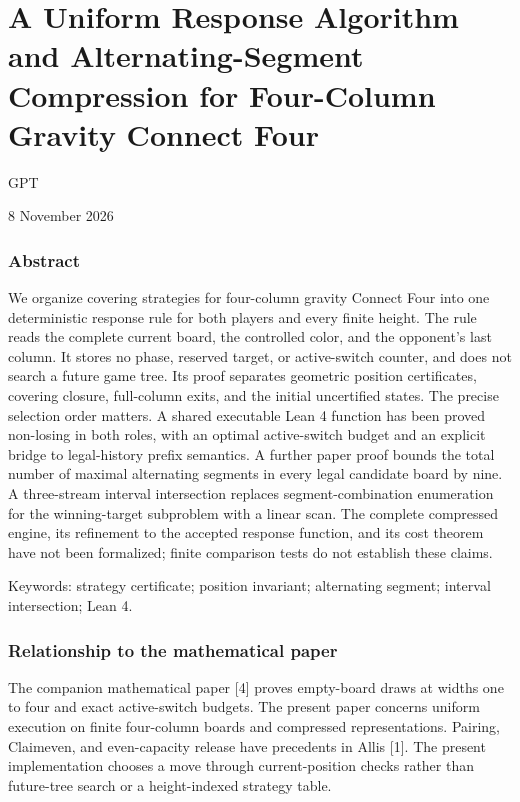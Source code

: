 \documentclass[
  a4paper,
]{article}
\author{GPT}
\date{}
\begin{document}
\section{A Uniform Response Algorithm and Alternating-Segment
Compression for Four-Column Gravity Connect
Four}\label{a-uniform-response-algorithm-and-alternating-segment-compression-for-four-column-gravity-connect-four}

GPT

8 November 2026

\subsubsection{Abstract}\label{abstract}

We organize covering strategies for four-column gravity Connect Four
into one deterministic response rule for both players and every finite
height. The rule reads the complete current board, the controlled color,
and the opponent's last column. It stores no phase, reserved target, or
active-switch counter, and does not search a future game tree. Its proof
separates geometric position certificates, covering closure, full-column
exits, and the initial uncertified states. The precise selection order
matters. A shared executable Lean 4 function has been proved non-losing
in both roles, with an optimal active-switch budget and an explicit
bridge to legal-history prefix semantics. A further paper proof bounds
the total number of maximal alternating segments in every legal
candidate board by nine. A three-stream interval intersection replaces
segment-combination enumeration for the winning-target subproblem with a
linear scan. The complete compressed engine, its refinement to the
accepted response function, and its cost theorem have not been
formalized; finite comparison tests do not establish these claims.

Keywords: strategy certificate; position invariant; alternating segment;
interval intersection; Lean 4.

\subsubsection{Relationship to the mathematical
paper}\label{relationship-to-the-mathematical-paper}

The companion mathematical paper {[}4{]} proves empty-board draws at
widths one to four and exact active-switch budgets. The present paper
concerns uniform execution on finite four-column boards and compressed
representations. Pairing, Claimeven, and even-capacity release have
precedents in Allis {[}1{]}. The present implementation chooses a move
through current-position checks rather than future-tree search or a
height-indexed strategy table.
\end{document}
